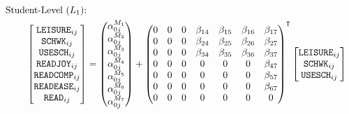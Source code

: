 \documentclass[a4paper,11pt,UKenglish,twoside,openright]{report}\usepackage[]{graphicx}\usepackage[]{color}
\begin{document}
\begin{equation}
    \begin{aligned}
        \text{Student-Level ($L_1$):}\\
        \begin{bmatrix}
            \texttt{LEISURE}_{ij}\\
            \texttt{SCHWK}_{ij}\\
            \texttt{USESCH}_{ij}\\
            \texttt{READJOY}_{ij}\\
            \texttt{READCOMP}_{ij}\\
            \texttt{READEASE}_{ij}\\
            \texttt{READ}_{ij}
        \end{bmatrix} &=
        \begin{pmatrix}
            \alpha_{0j}^{M_1}\\
            \alpha_{0j}^{M_2}\\
            \alpha_{0j}^{M_3}\\
            \alpha_{0j}^{M_4}\\
            \alpha_{0j}^{M_5}\\
            \alpha_{0j}^{M_6}\\
            \alpha_{0j}^{M_7}
        \end{pmatrix} +
        \begin{pmatrix}
            0   &0  &0  &\beta_{14}   &\beta_{15}  &\beta_{16}   &\beta_{17}\\
            0   &0  &0  &\beta_{24}   &\beta_{25}  &\beta_{26}   &\beta_{27}\\
            0   &0  &0  &\beta_{34}   &\beta_{35}  &\beta_{36}   &\beta_{37}\\
            0   &0  &0  &0            &0           &0            &\beta_{47}\\
            0   &0  &0  &0            &0           &0            &\beta_{57}\\
            0   &0  &0  &0            &0           &0            &\beta_{67}\\
            0   &0  &0  &0            &0           &0            &0\\
        \end{pmatrix}\Ts
        \begin{bmatrix}
            \texttt{LEISURE}_{ij}\\
            \texttt{SCHWK}_{ij}\\
            \texttt{USESCH}_{ij}\\

\end{bmatrix}
\end{aligned}
\end{equation}
\end{document}
